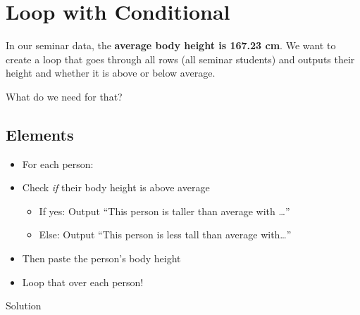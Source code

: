 \documentclass[
]{book}
\providecommand{\tightlist}{%
  \setlength{\itemsep}{0pt}\setlength{\parskip}{0pt}}
\begin{document}
\section{Loop with Conditional}\label{loop-with-conditional}

In our seminar data, the \textbf{average body height is 167.23 cm}.
We want to create a loop that goes through all rows (all seminar students) and outputs their height and whether it is above or below average.

What do we need for that?

\subsection{Elements}\label{elements}

\begin{itemize}
\tightlist
\item
  For each person:
\item
  Check \emph{if} their body height is above average

  \begin{itemize}
  \tightlist
  \item
    If yes: Output ``This person is taller than average with \ldots{}''
  \item
    Else: Output ``This person is less tall than average with\ldots{}''
  \end{itemize}
\item
  Then paste the person's body height
\item
  Loop that over each person!
\end{itemize}

Solution
\end{document}
